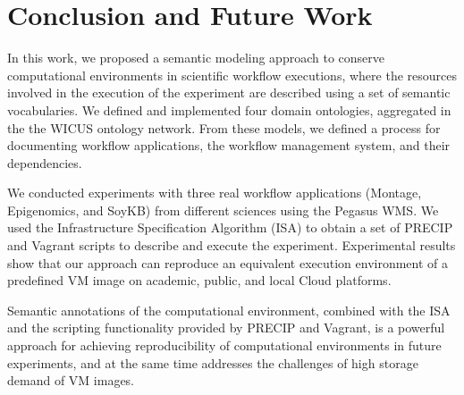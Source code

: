 \section{Conclusion and Future Work}
\label{sec:conclusion}

In this work, we proposed a semantic modeling approach to conserve 
computational environments in scientific workflow executions, where  
the resources involved in the execution of the experiment are described 
using a set of semantic vocabularies. We defined and implemented four 
domain ontologies, aggregated in the the WICUS ontology network. From 
these models, we defined a process for documenting workflow applications, 
the workflow management system, and their dependencies.

We conducted experiments with three real workflow applications (Montage, 
Epigenomics, and SoyKB) from different sciences using the Pegasus WMS. 
We used the Infrastructure Specification Algorithm (ISA) to obtain a set of 
PRECIP and Vagrant scripts to describe and execute the experiment. 
Experimental results show that our approach can reproduce an equivalent 
execution environment of a predefined VM image on academic, public, and 
local Cloud platforms.

Semantic annotations of the computational environment, combined with the 
ISA and the scripting functionality provided by PRECIP and Vagrant, is a 
powerful approach for achieving reproducibility of computational environments 
in future experiments, and at the same time addresses the challenges of high 
storage demand of VM images. 


